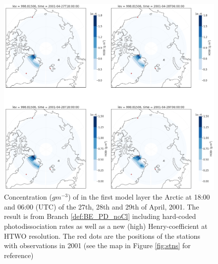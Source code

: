 \begin{figure}[h]
    \centering
    \includegraphics[width=\linewidth]{Chapter6_Results/images/Polar_StationComp_2001/HOBr/polarHOBr_HTWO_step3.png}
    \caption{Concentration ($g m^{-3}$) of  in the first model layer the Arctic at 18:00 and 06:00 (UTC) of the 27th, 28th and 29th of April, 2001. The result is from  Branch \ref{def:BE_PD_noCl} including hard-coded photodissociation rates as well as a new (high) Henry-coefficient at HTWO resolution. The red dots are the positions of the stations with observations in 2001 (see the map in Figure \ref{fig:stns} for reference)}
    \label{fig:polarHOBr_HTWO_step3}
\end{figure}
